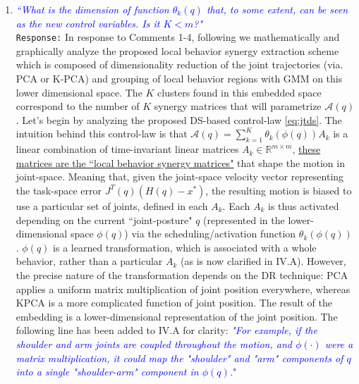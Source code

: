 \documentclass{article}
\begin{document}
\begin{enumerate}
\item \textcolor{blue}{\textit{``What is the dimension of function $\theta_k(q)$ that, to some extent, can be seen as the new control variables. Is it $K<m$?"}}\\

\texttt{Response:} In response to Comments 1-4, following we mathematically and graphically analyze the proposed local behavior synergy extraction scheme which is composed of dimensionality reduction of the joint trajectories (via. PCA or K-PCA) and grouping of local behavior regions with GMM on this lower dimensional space. The $K$ clusters found in this embedded space correspond to the number of $K$ synergy matrices that will parametrize $\mathcal{A}(q)$. Let's begin by analyzing the proposed DS-based control-law \eqref{eq:jtds}. The intuition behind this control-law is that $\mathcal{A}(q) = \sum\limits_{k=1}^{K}\theta_k(\phi(q))A_k$ is a linear combination of time-invariant linear matrices $A_k \in \mathbb{R}^{m \times m}$, \underline{these matrices are the ``local behavior synergy matrices"} that shape the motion in joint-space. Meaning that, given the joint-space velocity vector representing the task-space error $J^{T}(q)(H(q)-x^*)$, the resulting motion is biased to use a particular set of joints, defined in each $A_k$. Each $A_k$ is thus activated depending on the current ``joint-posture" $q$ (represented in the lower-dimensional space $\phi(q)$) via the scheduling/activation function $\theta_k(\phi(q))$.
$\phi(q)$ is a learned transformation, which is associated with a whole behavior, rather than a particular $A_k$ (as is now clarified in IV.A). However, the precise nature of the transformation depends on the DR technique: PCA applies a uniform matrix multiplication of joint position everywhere, whereas KPCA is a more complicated function of joint position.  The result of the embedding is a lower-dimensional representation of the joint position. The following line has been added to IV.A for clarity:
\textcolor{blue}{\small \textit{"For example, if the shoulder and arm joints are coupled throughout the motion, and $\phi(\cdot)$ were a matrix multiplication, it could map the "shoulder" and "arm" components of $q$ into a single "shoulder-arm" component in $\phi(q)$.}"}


\end{enumerate}
\end{document}

